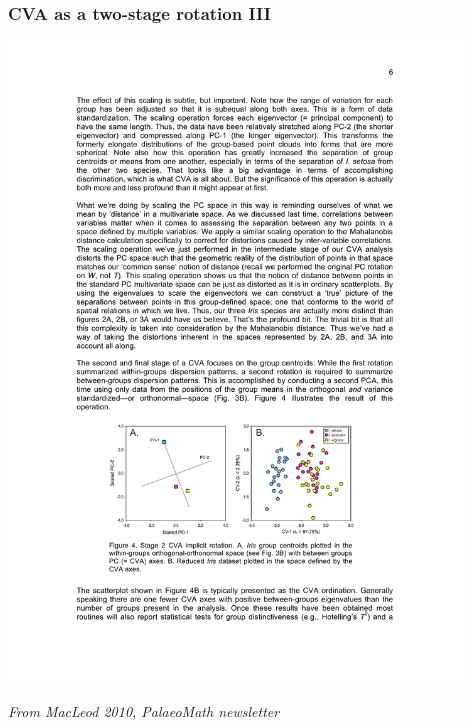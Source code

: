 \documentclass{beamer}
\begin{document}
\begin{frame}
  \frametitle{CVA as a two-stage rotation III}
  
\begin{center}
\includegraphics[width=0.9\textwidth]{cva-as-rot3}
\end{center}

\hfill {\scriptsize \textit{From MacLeod 2010, PalaeoMath newsletter}}


\end{frame}
\end{document}
